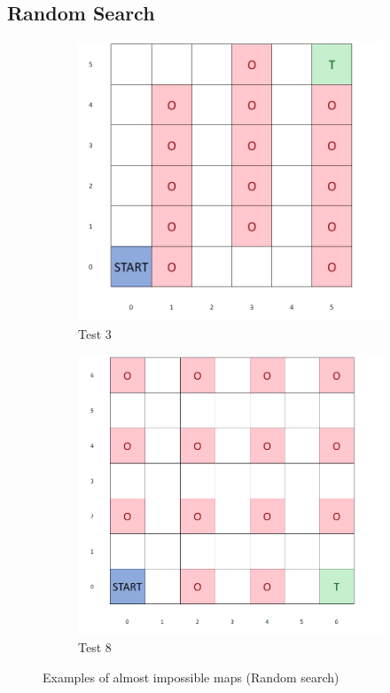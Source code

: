 \documentclass{article}
\begin{document}
\subsection{Random Search}
\begin{figure}[H]
   	 \centering
     \begin{subfigure}[b]{0.40\textwidth}
         \centering
         \includegraphics[width=\textwidth]{images/test3.png}
         \caption{Test 3}
         \label{fig:test3}
     \end{subfigure}
     \hfill
     \begin{subfigure}[b]{0.40\textwidth}
         \centering
         \includegraphics[width=\textwidth]{images/test8.png}
         \caption{Test 8}
         \label{fig:test8}
     \end{subfigure}
     \caption{Examples of almost impossible maps (Random search)}
\end{figure}
\end{document}
